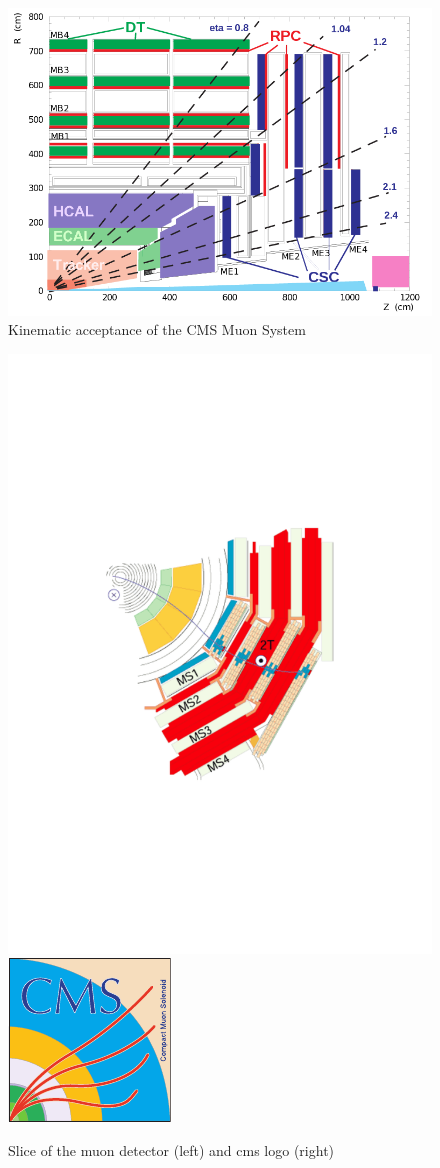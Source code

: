 {\begin{figure}
\begin{center}
\includegraphics[width=.85\textwidth]{pics/muon_diagram}
\end{center}
\caption{Kinematic acceptance of the CMS Muon System}
\label{fig:muon_diagram}
\end{figure}

\begin{figure}
\begin{center}
\includegraphics[width=.45\textwidth]{pics/muon_slice}
\includegraphics[width=.45\textwidth]{pics/cms_logo}
\end{center}
\caption{Slice of the muon detector (left) and cms logo (right)}
\label{fig:muon_slice}
\end{figure}


}
